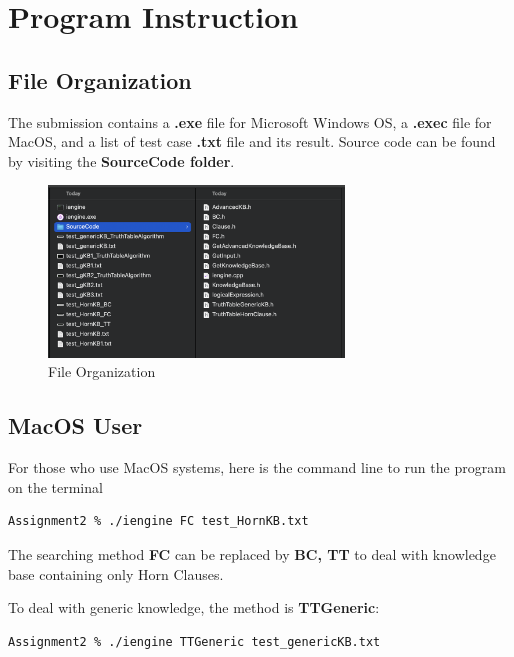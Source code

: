 \documentclass{assignment}
\begin{document}
\tableofcontents


\newpage
\section{Program Instruction}
\subsection{File Organization}

The submission contains a \textbf{.exe} file for Microsoft Windows OS, a \textbf{.exec} file for MacOS, and a list of test case \textbf{.txt} file and its result. Source code can be found by visiting the \textbf{SourceCode folder}. 

\begin{figure}[h]
    \centering
    \includegraphics[width=0.7\textwidth]{./assets/FileOrganization.png}
    \caption{File Organization}
    \label{fig:fig1}
\end{figure}


\subsection{MacOS User}
For those who use MacOS systems, here is the command line to run the program on the terminal

\begin{verbatim}
Assignment2 % ./iengine FC test_HornKB.txt 
\end{verbatim}

The searching method \textbf{FC} can be replaced by \textbf{BC, TT} to deal with knowledge base containing only Horn Clauses.


To deal with generic knowledge, the method is \textbf{TTGeneric}:

\begin{verbatim}
Assignment2 % ./iengine TTGeneric test_genericKB.txt 
\end{verbatim}
\end{document}
